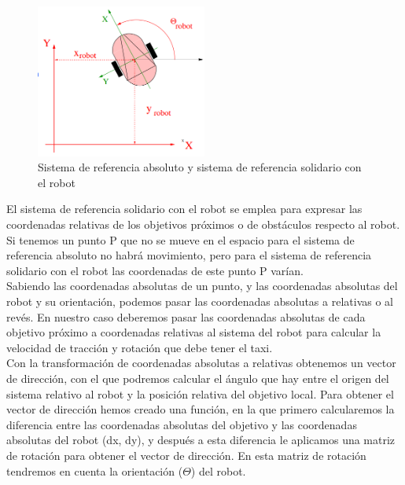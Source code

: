 \begin{figure}[H]
  \begin{center}
    \includegraphics[width=0.5\textwidth]{figures/GPP/sistemasReferencia.png}
		\caption{Sistema de referencia absoluto y sistema de referencia solidario con el robot}
		\label{fig.sistemasReferencia_gpp}
		\end{center}
\end{figure}

El sistema de referencia solidario con el robot se emplea para expresar las coordenadas relativas de los objetivos próximos o de obstáculos respecto al robot. Si tenemos un punto P que no se mueve en el espacio para el sistema de referencia absoluto no habrá movimiento, pero para el sistema de referencia solidario con el robot las coordenadas de este punto P varían.\\

Sabiendo las coordenadas absolutas de un punto, y las coordenadas absolutas del robot y su orientación, podemos pasar las coordenadas absolutas a relativas o al revés. En nuestro caso deberemos pasar las coordenadas absolutas de cada objetivo próximo a coordenadas relativas al sistema del robot para calcular la velocidad de tracción y rotación que debe tener el taxi.\\

Con la transformación de coordenadas absolutas a relativas obtenemos un vector de dirección, con el que podremos calcular el ángulo que hay entre el origen del sistema relativo al robot y la posición relativa del objetivo local. Para obtener el vector de dirección hemos creado una función, en la que primero calcularemos la diferencia entre las coordenadas absolutas del objetivo y las coordenadas absolutas del robot (dx, dy), y después a esta diferencia le aplicamos una matriz de rotación para obtener el vector de dirección. En esta matriz de rotación tendremos en cuenta la orientación  (\(\Theta\)) del robot.

